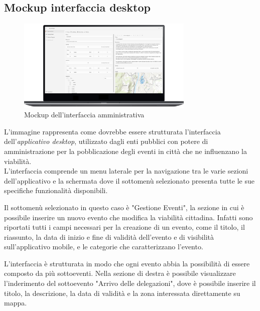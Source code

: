 \documentclass{article}
\begin{document}
\clearpage

\subsection{Mockup interfaccia desktop}
\begin{figure}[htbp]
    \label{4.2}
    \centering
    \includegraphics[width=0.75\textwidth]{Images/Mockup1 - Desktop.png}
    \caption{Mockup dell'interfaccia amministrativa}
\end{figure}

L'immagine rappresenta come dovrebbe essere strutturata l'interfaccia dell'\textit{applicativo desktop}, utilizzato dagli enti pubblici con potere di amministrazione per la pobblicazione degli eventi in città che ne influenzano la viabilità.\\
L'interfaccia comprende un menu laterale per la navigazione tra le varie sezioni dell'applicativo e la schermata dove il sottomenù selezionato presenta tutte le sue specifiche funzionalità disponibili.

Il sottomenù selezionato in questo caso è "Gestione Eventi", la sezione in cui è possibile inserire un nuovo evento che modifica la viabilità cittadina. Infatti sono riportati tutti i campi necessari per la creazione di un evento, come il titolo, il riassunto, la data di inizio e fine di validità dell'evento e di visibilità sull'applicativo mobile, e le categorie che caratterizzano l'evento.

L'interfaccia è strutturata in modo che ogni evento abbia la possibilità di essere composto da più sottoeventi. Nella sezione di destra è possibile visualizzare l'inderimento del sottoevento "Arrivo delle delegazioni", dove è possibile inserire il titolo, la descrizione, la data di validità e la zona interessata direttamente su mappa.\\

\clearpage
\end{document}
